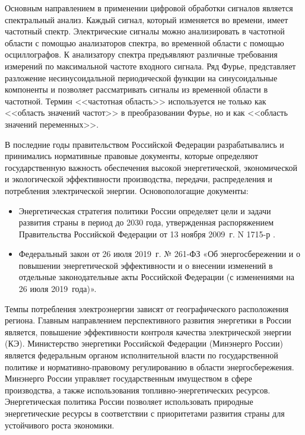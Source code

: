 Основным направлением в применении цифровой обработки сигналов является спектральный анализ. Каждый сигнал, который изменяется во времени, имеет частотный спектр. Электрические сигналы можно анализировать в частотной области с помощью анализаторов спектра, во временной области с помощью осциллографов. К анализатору спектра предъявляют различные требования измерений по максимальной  частоте входного сигнала. Ряд Фурье, представляет разложение несинусоидальной периодической функции на синусоидальные компоненты и позволяет рассматривать сигналы из временной области в частотной. Термин <<частотная область>> используется не только как <<область значений частот>> в преобразовании Фурье, но и как <<область значений переменных>>.

В последние годы правительством Российской Федерации разрабатывались и принимались нормативные правовые документы, которые
определяют государственную важность обеспечения высокой
энергетической, экономической и экологической эффективности производства,
передачи, распределения и потребления электрической энергии. Основопологащие документы:
\begin{itemize}
	\item Энергетическая стратегия политики России определяет цели и задачи развития страны в период до 2030 года, утвержденная распоряжением Правительства Российской Федерации от 13 ноября 2009~г. N 1715-р \cite{energy_strategy}. 
	\item Федеральный закон от 26 июля 2019~г. № 261-ФЗ «Об энергосбережении и о повышении энергетической эффективности и о внесении изменений в отдельные законодательные акты Российской Федерации (с изменениями на 26 июля 2019~года)»\cite{law_energy saving_2019}.
\end{itemize}


Темпы потребления электроэнергии зависят от географического расположения региона. Главным направлением перспективного развития энергетики в России является, повышение эффективности контроля качества электрической энергии (КЭ). 
Министерство энергетики Российской Федерации (Минэнерго России) является федеральным органом исполнительной власти по государственной политике и нормативно-правовому регулированию в области энергосбережения. Минэнерго России управляет государственным имуществом в сфере производства, а также использования топливно-энергетических ресурсов. Энергетическая политика России позволяет использовать природные энергетические ресурсы в соответствии с приоритетами развития страны для устойчивого роста экономики. 

